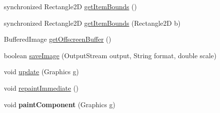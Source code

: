 \begin{DoxyCompactItemize}
\item 
synchronized \-Rectangle2\-D \hyperlink{classprefuse_1_1_display_ab2c74f52b16865c49185aca6f0def445}{get\-Item\-Bounds} ()
\item 
synchronized \-Rectangle2\-D \hyperlink{classprefuse_1_1_display_ae2b6e52753a4c318c70bd56c1fde3b73}{get\-Item\-Bounds} (\-Rectangle2\-D b)
\item 
\-Buffered\-Image \hyperlink{classprefuse_1_1_display_a00d50105e2d71f4d182dd9ec16f5a4aa}{get\-Offscreen\-Buffer} ()
\item 
boolean \hyperlink{classprefuse_1_1_display_a4e86a936b9d2869584f3e93ebdf7a28d}{save\-Image} (\-Output\-Stream output, \-String format, double scale)
\item 
void \hyperlink{classprefuse_1_1_display_a3a09c2e0442e60fd36f3acfc45e1705b}{update} (\-Graphics g)
\item 
void \hyperlink{classprefuse_1_1_display_a5a904ad07f85220892844564f6f73ac2}{repaint\-Immediate} ()
\item 
\hypertarget{classprefuse_1_1_display_a08e975ed88fc3a323ac9af026d2c2599}{void {\bfseries paint\-Component} (\-Graphics g)}\label{classprefuse_1_1_display_a08e975ed88fc3a323ac9af026d2c2599}


\end{DoxyCompactItemize}

